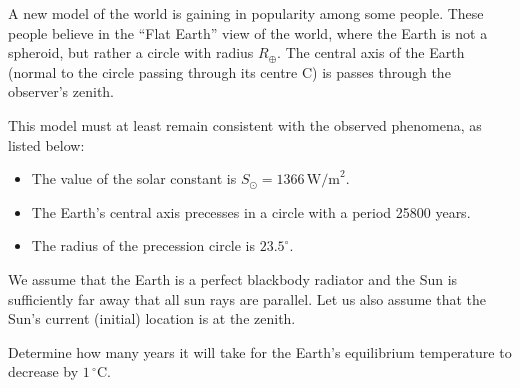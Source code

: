 A new model of the world is gaining in popularity among some people. These
people believe in the ``Flat Earth'' view of the world, where the Earth is not
a spheroid, but rather a circle with radius $R_\oplus$. The central axis of
the Earth (normal to the circle passing through its centre C) is passes
through the observer's zenith.

This model must at least remain consistent with the observed phenomena, as
listed below:
\begin{itemize}
\item The value of the solar constant is
  $S_\odot = 1366\,\mathrm{W/m}^2$.
\item The Earth's central axis precesses in a circle with a period
  25800 years.
\item The radius of the precession circle is $23.5^\circ$.
\end{itemize}

We assume that the Earth is a perfect blackbody radiator and the Sun is
sufficiently far away that all sun rays are parallel. Let us also assume that
the Sun's current (initial) location is at the zenith.

Determine how many years it will take for the Earth's equilibrium temperature
to decrease by $1\,^\circ$C.
